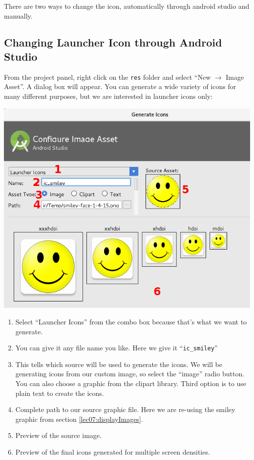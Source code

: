 There are two ways to change the icon, automatically through android studio and manually. 

\subsection{Changing Launcher Icon through Android Studio}
\label{ITS:changingLauncherIconThroughAndroidStudio}
From the project panel, right click on the \texttt{res} folder and select ``New $\rightarrow$ Image Asset''. A dialog box will appear. You can generate a wide variety of icons for many different purposes, but we are interested in launcher icons only:

\begin{center}
	\includegraphics[scale=0.4]{chapters/ch06/images/23}
\end{center}

\begin{enumerate}
	\item Select ``Launcher Icons'' from the combo box because that's what we want to generate.
	\item You can give it any file name you like. Here we give it ``\texttt{ic\_smiley}''
	\item This tells which source will be used to generate the icons. We will be generating icons from our custom image, so select the ``image'' radio button. You can also choose a graphic from the clipart library. Third option is to use plain text to create the icons.
	\item Complete path to our source graphic file. Here we are re-using the smiley graphic from section \ref{lec07:displayImages}.
	\item Preview of the source image.
	\item Preview of the final icons generated for multiple screen densities.
\end{enumerate}

